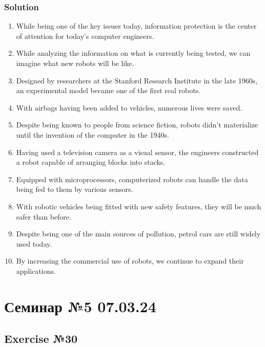 \subsection*{Solution}
\begin{enumerate}
      \item While being one of the key issues today, information protection is the center of attention for today’s computer engineers.
      \item While analyzing the information on what is currently being tested, we can imagine what new robots will be like.
      \item Designed by researchers at the Stanford Research Institute in the late 1960s, an experimental model became one of the first real robots.
      \item With airbags having been added to vehicles, numerous lives were saved.
      \item Despite being known to people from science fiction, robots didn’t materialize until the invention of the computer in the 1940s.
      \item Having used a television camera as a visual sensor, the engineers constructed a robot capable of arranging blocks into stacks.
      \item Equipped with microprocessors, computerized robots can handle the data being fed to them by various sensors.
      \item With robotic vehicles being fitted with new safety features, they will be much safer than before.
      \item Despite being one of the main sources of pollution, petrol cars are still widely used today.
      \item By increasing the commercial use of robots, we continue to expand their applications.
\end{enumerate}

\chapter{Семинар №5 07.03.24}

\section{Exercise №30}
